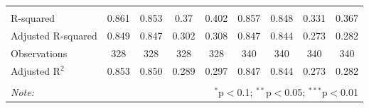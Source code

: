 \begin{table}[!htbp]
\begin{tabular}{@{\extracolsep{5pt}}lcccccccc}
\hline \\[-1.8ex] 
R-squared & 0.861 & 0.853 & 0.37 & 0.402 & 0.857 & 0.848 & 0.331 & 0.367 \\ 
Adjusted R-squared & 0.849 & 0.847 & 0.302 & 0.308 & 0.847 & 0.844 & 0.273 & 0.282 \\ 
Observations & 328 & 328 & 328 & 328 & 340 & 340 & 340 & 340 \\ 
Adjusted R$^{2}$ & 0.853 & 0.850 & 0.289 & 0.297 & 0.847 & 0.844 & 0.273 & 0.282 \\ 
\hline 
\hline \\[-1.8ex] 
\textit{Note:}  & \multicolumn{8}{r}{$^{*}$p$<$0.1; $^{**}$p$<$0.05; $^{***}$p$<$0.01} \\ 
\end{tabular} 
\end{table} 
